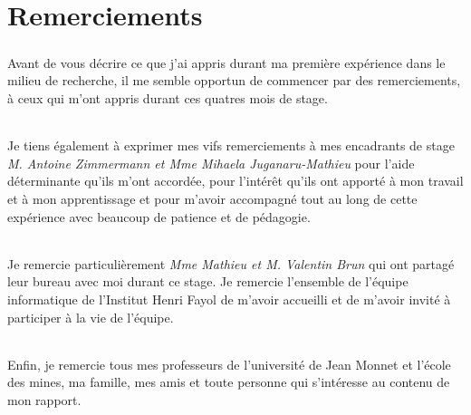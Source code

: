 \chapter*{Remerciements}
\paragraph{}
Avant de vous décrire ce que j’ai appris durant ma première expérience dans le milieu de recherche, il me semble opportun de commencer par des remerciements, à ceux qui m’ont appris durant ces quatres mois de stage. 
\subparagraph{}
Je tiens également à exprimer mes vifs remerciements à mes encadrants de stage {\it M. Antoine Zimmermann et Mme Mihaela Juganaru-Mathieu} pour l’aide déterminante qu’ils m’ont accordée, pour l’intérêt qu’ils ont apporté à mon travail et à mon apprentissage et pour m’avoir accompagné tout au long de cette expérience avec beaucoup de patience et de pédagogie.
\subparagraph{}
Je remercie particulièrement {\it Mme Mathieu et M. Valentin Brun} qui ont partagé leur bureau avec moi durant ce stage. 
Je remercie l'ensemble de l'équipe informatique de l'Institut Henri Fayol de m'avoir accueilli et de m'avoir
invité à participer à la vie de l'équipe.
\subparagraph{}
Enfin, je remercie tous mes professeurs de l’université de Jean Monnet et l'école des mines, ma famille, mes amis et toute personne qui s’intéresse au contenu de mon rapport.

